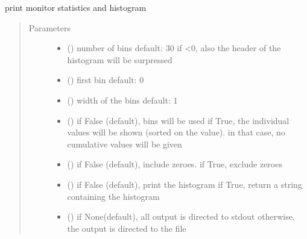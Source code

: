 \documentclass[letterpaper,10pt,english]{sphinxmanual}
\begin{document}
\begin{fulllineitems}

\begin{fulllineitems}
\label{\detokenize{Reference:salabim.Monitor.print_histograms}}
print monitor statistics and histogram
\begin{quote}\begin{description}
\item[{Parameters}] \leavevmode\begin{itemize}
\item {} 
 () \textendash{} number of bins 
default: 30 
if \textless{}0, also the header of the histogram will be surpressed

\item {} 
 () \textendash{} first bin 
default: 0

\item {} 
 () \textendash{} width of the bins 
default: 1

\item {} 
 () \textendash{} if False (default), bins will be used 
if True, the individual values will be shown (sorted on the value).
in that case, no cumulative values will be given 

\item {} 
 () \textendash{} if False (default), include zeroes. if True, exclude zeroes

\item {} 
 () \textendash{} if False (default), print the histogram
if True, return a string containing the histogram

\item {} 
 () \textendash{} if None(default), all output is directed to stdout 
otherwise, the output is directed to the file

\end{itemize}


\end{description}
\end{quote}
\end{fulllineitems}
\end{fulllineitems}
\end{document}
